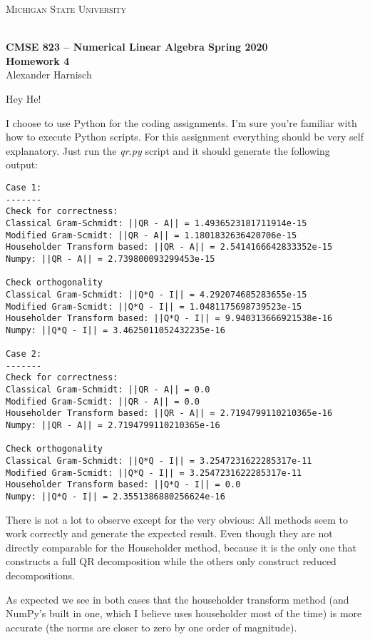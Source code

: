 \documentclass[a4paper, 11pt]{article}
\begin{document}
\noindent
\centerline{\small{\textsc{Michigan State University}}} \\
\large{\textbf{CMSE 823 – Numerical Linear Algebra \hfill Spring 2020 \\
Homework 4}} \\
Alexander Harnisch \\
\noindent\makebox[\linewidth]{\rule{\textwidth}{0.4pt}}

Hey He!

I choose to use Python for the coding assignments. I'm sure you're familiar with how to execute Python scripts. For this assignment everything should be very self explanatory. Just run the \textit{qr.py} script and it should generate the following output:
\begin{verbatim}
Case 1:
-------
Check for correctness:
Classical Gram-Schmidt: ||QR - A|| = 1.4936523181711914e-15
Modified Gram-Scmidt: ||QR - A|| = 1.1801832636420706e-15
Householder Transform based: ||QR - A|| = 2.5414166642833352e-15
Numpy: ||QR - A|| = 2.739800093299453e-15

Check orthogonality
Classical Gram-Schmidt: ||Q*Q - I|| = 4.292074685283655e-15
Modified Gram-Scmidt: ||Q*Q - I|| = 1.0481175698739523e-15
Householder Transform based: ||Q*Q - I|| = 9.940313666921538e-16
Numpy: ||Q*Q - I|| = 3.4625011052432235e-16

Case 2:
-------
Check for correctness:
Classical Gram-Schmidt: ||QR - A|| = 0.0
Modified Gram-Scmidt: ||QR - A|| = 0.0
Householder Transform based: ||QR - A|| = 2.7194799110210365e-16
Numpy: ||QR - A|| = 2.7194799110210365e-16

Check orthogonality
Classical Gram-Schmidt: ||Q*Q - I|| = 3.2547231622285317e-11
Modified Gram-Scmidt: ||Q*Q - I|| = 3.2547231622285317e-11
Householder Transform based: ||Q*Q - I|| = 0.0
Numpy: ||Q*Q - I|| = 2.3551386880256624e-16
\end{verbatim}

There is not a lot to observe except for the very obvious: All methods seem to
work correctly and generate the expected result. Even though they are not
directly comparable for the Householder method, because it is the only one that
constructs a full QR decomposition while the others only construct reduced
decompositions.

As expected we see in both cases that the householder transform method (and
NumPy's built in one, which I believe uses householder most of the time) is
more accurate (the norms are closer to zero by one order of magnitude). 
\end{document}
